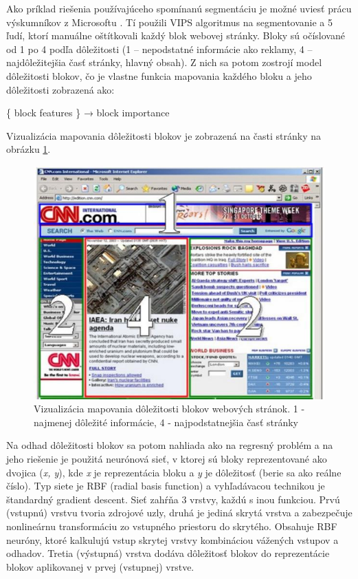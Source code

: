 	Ako príklad riešenia používajúceho spomínanú segmentáciu je možné uviesť prácu výskumníkov z Microsoftu \cite{block_importance}. Tí použili VIPS algoritmus na segmentovanie a 5 ľudí, ktorí manuálne oštítkovali každý blok webovej stránky. Bloky sú očíslované od 1 po 4 podľa dôležitosti (1 – nepodstatné informácie ako reklamy, 4 – najdôležitejšia časť stránky, hlavný obsah). Z nich sa potom zostrojí model dôležitosti blokov, čo je vlastne funkcia mapovania každého bloku a jeho dôležitosti zobrazená ako:    
	\begin {center}
	\center \{ block features \} → block importance
	\newline
	\end {center}

	Vizualizácia mapovania dôležitosti blokov je zobrazená na časti stránky na obrázku \ref{fig:cnn_rbf}.

		\begin{figure}[H]
			\begin{center}\includegraphics[scale=0.3]{cnn_rbf.jpeg}\end{center}
			\caption[Vizualizácia mapovania dôležitosti blokov webových stránok]{Vizualizácia mapovania dôležitosti blokov webových stránok\cite{block_importance}. 1 - najmenej dôležité informácie, 4 - najpodstatnejšia časť stránky}\label{fig:cnn_rbf}
		\end{figure}

	Na odhad dôležitosti blokov sa potom nahliada ako na regresný problém a na jeho riešenie je  použitá neurónová sieť, v ktorej sú bloky reprezentované ako dvojica (\textit{x, y}), kde \textit{x} je reprezentácia bloku a \textit{y} je dôležitosť (berie sa ako reálne číslo).  Typ siete je RBF (radial basis function) a vyhľadávacou technikou je štandardný gradient descent. Sieť zahŕňa 3 vrstvy, každú s inou funkciou. Prvú (vstupnú) vrstvu tvoria zdrojové uzly, druhá je jediná skrytá vrstva a zabezpečuje nonlineárnu transformáciu zo vstupného priestoru do skrytého. Obsahuje RBF neuróny, ktoré kalkulujú vstup skrytej vrstvy kombináciou vážených vstupov a odhadov. Tretia (výstupná) vrstva dodáva dôležitosť blokov do reprezentácie blokov aplikovanej v prvej (vstupnej) vrstve. 
	
